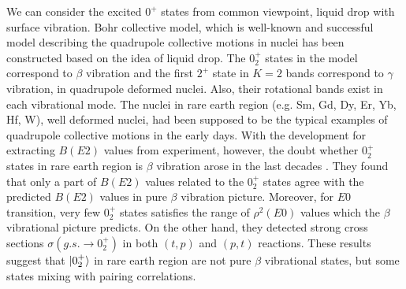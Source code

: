 \documentclass[11pt]{book} %
\begin{document}
We can consider the excited $0^+$ states from common viewpoint, liquid drop with surface vibration. Bohr collective model, which is well-known and successful model describing the quadrupole collective motions in nuclei \cite{BM75} has been constructed based on the idea of liquid drop. The $0_2^+$ states in the model correspond to $\beta$ vibration and the first $2^+$ state in $K=2$ bands correspond to $\gamma$ vibration, in quadrupole deformed nuclei. Also, their rotational bands exist in each vibrational mode. The nuclei in rare earth region (e.g. Sm, Gd, Dy, Er, Yb, Hf, W), well deformed nuclei, had been supposed to be the typical examples of quadrupole collective motions in the early days. 
With the development for extracting $B(E2)$ values from experiment, however, the doubt whether $0_2^+$ states in rare earth region is $\beta$ vibration arose in the last decades \cite{G01, Kulp08, SS11}. They found that only a part of $B(E2)$ values related to the $0_2^+$ states agree with the predicted $B(E2)$ values in pure $\beta$ vibration picture. Moreover, for $E0$ transition, very few $0_2^+$ states satisfies the range of $\rho^2(E0)$ values which the $\beta$ vibrational picture predicts. On the other hand, they detected strong cross sections $\sigma(g.s.\to 0_{2}^+)$ in both $(t, p)$ and $(p, t)$ reactions. These results suggest that $\ket{0_2^+}$ in rare earth region are not pure $\beta$ vibrational states, but some states mixing with pairing correlations.
\end{document}
